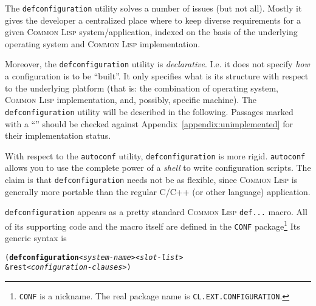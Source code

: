 \documentclass[a4paper]{article}
\newcommand{\CL}{\textsc{Common Lisp}}
\newcommand{\defconfiguration}{\texttt{defconfiguration}}
\newcommand{\notimpl}{\ddag}
\newcommand{\code}[1]{\texttt{#1}}
\begin{document}
 The \defconfiguration{} utility solves a number of issues (but not
all). Mostly it gives the developer a centralized place where to keep
diverse requirements for a given \CL{} system/application, indexed on
the basis of the underlying operating system and \CL{} implementation.

Moreover, the \defconfiguration{} utility is
\emph{declarative}. I.e. it does not specify \emph{how} a
configuration is to be ``built''. It only specifies what is its
structure with respect to the underlying platform (that is: the
combination of operating system, \CL{} implementation, and, possibly,
specific machine).  The \defconfiguration{} utility will be described
in the following. Passages marked with a ``\notimpl{}'' should be checked
against Appendix~\ref{appendix:unimplemented} for their implementation
status.

With respect to the \code{autoconf} utility, \defconfiguration{} is more
rigid.  \code{autoconf} allows you to use the complete power of a
\emph{shell} to write configuration scripts. The claim is that
\defconfiguration{} needs not be as flexible, since \CL{} is generally
more portable than the regular C/C++ (or other language) application.

\defconfiguration{} appears as a pretty standard \CL{} \code{def...}
macro. All of its supporting code and the macro itself are defined in
the \code{CONF} package\footnote{\code{CONF} is a nickname.  The real
package name is \code{CL.EXT.CONFIGURATION}.} Its generic syntax is

\begin{alltt}
(\textbf{defconfiguration} \emph{<system-name>} \emph{<slot-list>}
   &rest  \emph{<configuration-clauses>})
\end{alltt}
\end{document}
